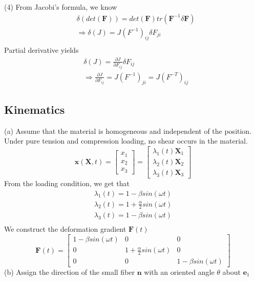 \documentclass{elsarticle}
\begin{document}
(4)
From Jacobi's formula, we know
\begin{align*}
    &\delta(det(\mathbf{F}))=det(\mathbf{F})tr(\mathbf{F}^{-1}\delta\mathbf{F})\\
    &\Rightarrow\delta(J)=J(F^{-1})_{ij}\delta F_{ji}\\
\end{align*}
Partial derivative yields
\begin{align*}
    &\delta(J)=\frac{\partial J}{\partial F_{ij}}\delta F_{ij}\\
    &\Rightarrow\frac{\partial J}{\partial F_{ij}}=J(F^{-1})_{ji}=J(F^{-T})_{ij}
\end{align*}

\subsection{Kinematics}
(a)
Assume that the material is homogeneous and independent of the position. Under pure tension and compression loading, no shear occurs in the material.
\begin{equation*}
    \bm{x}(\bm{X},t)=
\begin{bmatrix}
x_1 \\
x_2 \\
x_3
\end{bmatrix}
=\begin{bmatrix}
\lambda_1(t)\bm{X}_1 \\
\lambda_2(t)\bm{X}_2 \\
\lambda_3(t)\bm{X}_3
\end{bmatrix}
\end{equation*}
From the loading condition, we get that
\begin{align*}
    \lambda_1(t)=1-\beta sin(\omega t)\\
    \lambda_2(t)=1+\frac{\alpha}{2}sin(\omega t)\\
    \lambda_3(t)=1-\beta sin(\omega t)\\
\end{align*}
We construct the deformation gradient $\bm{F}(t)$
\begin{equation*}
    \bm{F}(t)=
    \begin{bmatrix}
        1-\beta sin(\omega t) & 0 & 0\\
        0 & 1+\frac{\alpha}{2}sin(\omega t) & 0\\
        0 & 0 & 1-\beta sin(\omega t)
    \end{bmatrix}
\end{equation*}
(b)
Assign the direction of the small fiber $\bm{n}$ with an oriented angle $\theta$ about $\bm{e}_1$
\end{document}
